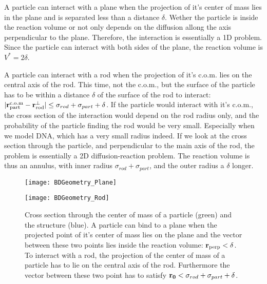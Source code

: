 A particle can interact with a plane when the projection of it's center of mass lies in the plane and is separated less than a distance $\delta$. Wether the particle is inside the reaction volume or not only depends on the diffusion allong the axis perpendicular to the plane. Therefore, the interaction is essentially a 1D problem. Since the particle can interact with both sides of the plane, the reaction volume is $V^*=2 \delta$.

A particle can interact with a rod when the projection of it's c.o.m. lies on the central axis of the rod. This time, not the c.o.m., but the surface of the particle has to be within a distance $\delta$ of the surface of the rod to interact: $|{\bf r}_{\rm part}^{\rm c.o.m}-{\bf r}_{\rm rod}^{\perp}| \leq \sigma_{rod}+\sigma_{part} + \delta$. If the particle would interact with it's c.o.m., the cross section of the interaction would depend on the rod radius only, and the probability of the particle finding the rod would be very small. Especially when we model DNA, which has a very small radius indeed. If we look at the cross section through the particle, and perpendicular to the main axis of the rod, the problem is essentially a 2D diffusion-reaction problem. The reaction volume is thus an annulus, with inner radius $\sigma_{rod} + \sigma_{part}$, and the outer radius a $\delta$ longer.

\begin{figure}[ht]
\begin{minipage}[ht]{.5\linewidth}
\centering
\texttt{[image: BDGeometry\_Plane]}
\end{minipage}
\begin{minipage}[ht]{.5\linewidth}
\centering
\texttt{[image: BDGeometry\_Rod]}
\end{minipage}
\caption{ Cross section through the center of mass of a particle (green) and the structure (blue). A particle can bind to a plane when the projected point of it's center of mass lies on the plane and the vector between these two points lies inside the reaction volume: ${\bf r}_{\rm perp}<\delta$. To interact with a rod, the projection of the center of mass of a particle has to lie on the central axis of the rod. Furthermore the vector between these two point has to satisfy ${\bf r_0} < \sigma_{rod} + \sigma_{part} + \delta$.}
\end{figure}


